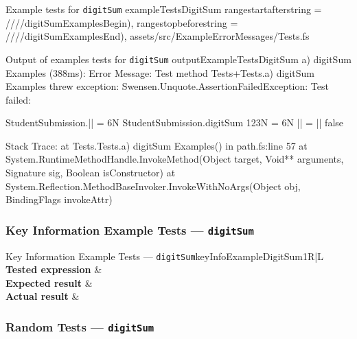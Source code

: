 \fsharpinput%
{Example tests for \texttt{digitSum}}%
{exampleTestsDigitSum}%
{
	rangestartafterstring = ////digitSumExamplesBegin),
	rangestopbeforestring = ////digitSumExamplesEnd),
}%
{assets/src/ExampleErrorMessages/Tests.fs}




\begin{fsharpoutput}%
{Output of examples tests for \texttt{digitSum}}%
{outputExampleTestsDigitSum}
a) digitSum Examples (388ms): Error Message: Test method Tests+Tests.a) digitSum Examples threw exception:
	Swensen.Unquote.AssertionFailedException: Test failed:

	StudentSubmission.|| = 6N
	StudentSubmission.digitSum 123N = 6N
	|| = ||
	false

	Stack Trace:
		at Tests.Tests.a) digitSum Examples() in path\to\Tests.fs:line 57
		at System.RuntimeMethodHandle.InvokeMethod(Object target, Void** arguments, Signature sig, Boolean isConstructor)
		at System.Reflection.MethodBaseInvoker.InvokeWithNoArgs(Object obj, BindingFlags invokeAttr)
\end{fsharpoutput}


\subsubsection{Key Information Example Tests --- \texttt{digitSum}} %


\begin{tcbtabular}{Key Information Example Tests --- \texttt{digitSum}}{keyInfoExampleDigitSum1}{R|L}{\normalsize}
	\textbf{Tested expression} & \\\hline
	\textbf{Expected result} & \\\hline
	\textbf{Actual result} & 
\end{tcbtabular}


\newpage %
\subsubsection{Random Tests --- \texttt{digitSum}} %


